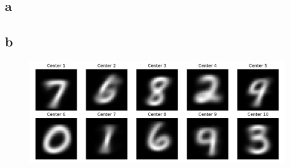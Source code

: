 \newpage
\section{}
\subsection{a}
\subsection{b}
\begin{figure}[!h]
    \centering\includegraphics[width=1\linewidth]{mnist_centers.png}
\end{figure}
\inputminted{python3}{../hw4-A/homeworks/k_means/k_means.py}
\inputminted{python3}{../hw4-A/homeworks/k_means/main.py}